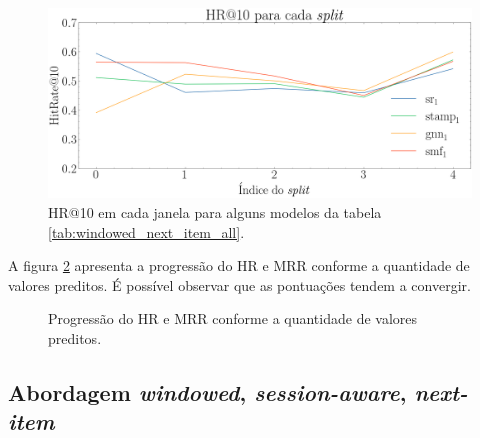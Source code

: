 \begin{figure}[htbp]
  \centering
  \includegraphics[width=1\textwidth]{chapters/chap04/images/hr10_splits.png}
  \caption{HR@10 em cada janela para alguns modelos da tabela
  \ref{tab:windowed_next_item_all}.}
  \label{fig:next-item-single}
\end{figure}


A figura \ref{fig:progressao} apresenta a progressão do HR e MRR conforme a
quantidade de valores preditos. É possível observar que as pontuações tendem
a convergir.
\newpage

\begin{figure}[htbp]
  \hfill
  \hfill
  \hfill
  \caption{Progressão do HR e MRR conforme a quantidade de valores preditos.}
  \label{fig:progressao}
  \end{figure}

\subsection{Abordagem \textit{windowed}, \textit{session-aware}, \textit{next-item}}

